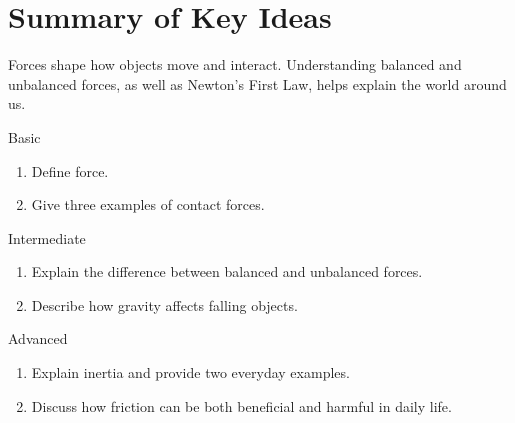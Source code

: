 \section{Summary of Key Ideas}

Forces shape how objects move and interact. Understanding balanced and unbalanced forces, as well as Newton's First Law, helps explain the world around us.

\begin{tieredquestions}{Basic}
\begin{enumerate}
    \item Define force.
    \item Give three examples of contact forces.
\end{enumerate}
\end{tieredquestions}

\begin{tieredquestions}{Intermediate}
\begin{enumerate}
    \item Explain the difference between balanced and unbalanced forces.
    \item Describe how gravity affects falling objects.
\end{enumerate}
\end{tieredquestions}

\begin{tieredquestions}{Advanced}
\begin{enumerate}
    \item Explain inertia and provide two everyday examples.
    \item Discuss how friction can be both beneficial and harmful in daily life.
\end{enumerate}
\end{tieredquestions}
